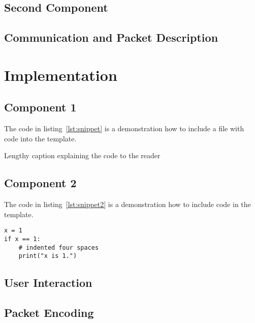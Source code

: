 \documentclass{article}
\newcommand{\includecode}[4]{#2}, captionpos=b, frame=single, label={#3}]{#4}}
\begin{document}
\subsection{Second Component}


\subsection{Communication and Packet Description}


\section{Implementation}
\label{sec:Implementation}


\subsection{Component 1}

The code in listing~\ref{lst:snippet} is a demonstration how to include a file with code into the template.

\includecode{Sample Code}{Lengthy caption explaining the code to the reader}{lst:snippet}{snippet.py}

\subsection{Component 2}

The code in listing~\ref{lst:snippet2} is a demonstration how to include code in the template.

\begin{lstlisting}[caption={[Sample Code 2]Second Lengthy caption}, label={lst:snippet2}]
x = 1
if x == 1:
    # indented four spaces
    print("x is 1.")
\end{lstlisting}


\subsection{User Interaction}

\subsection{Packet Encoding}
\end{document}
